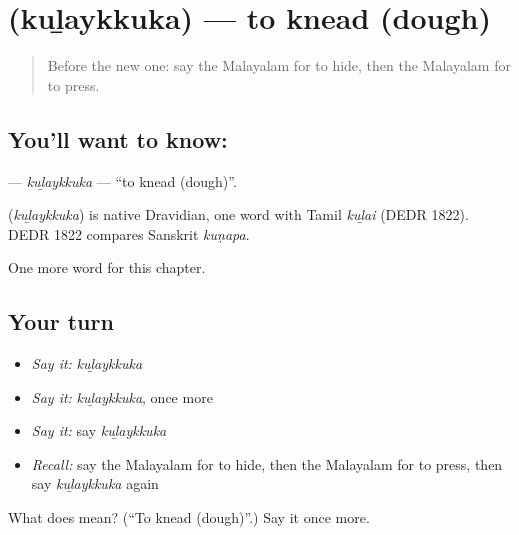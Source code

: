 \section[\texorpdfstring{\ml{കുഴയ്ക്കുക} (kuḻaykkuka)}{കുഴയ്ക്കുക (kuḻaykkuka)}]{ (kuḻaykkuka) — to knead (dough)}

\label{lesson:ML-C190-kulaykkuka}



\begin{quote}
Before the new one: say the Malayalam for to hide, then the Malayalam for to press.
\end{quote}

\subsection*{You'll want to know: }
\textbf{} — \emph{kuḻaykkuka} — \textquotedblleft{}to knead (dough)\textquotedblright{}.

\begin{cousinweb}
\textbf{} (\emph{kuḻaykkuka}) is native Dravidian, one word with Tamil \emph{kuḻai} (DEDR 1822). DEDR 1822 compares Sanskrit \emph{kuṇapa}.
\end{cousinweb}

\begin{grammarlens}[title={What you've built}]
One more word for this chapter.
\end{grammarlens}

\subsection*{Your turn}
\begin{itemize}
\raggedright
  \item \emph{Say it:} \emph{kuḻaykkuka}
  \item \emph{Say it:} \emph{kuḻaykkuka}, once more
  \item \emph{Say it:} say \emph{kuḻaykkuka}
  \item \emph{Recall:} say the Malayalam for to hide, then the Malayalam for to press, then say \emph{kuḻaykkuka} again
\end{itemize}

\begin{tcolorbox}[breakable,colback=teal!4,colframe=teal!35!black,title={Before you move on}]
What does  mean? (\textquotedblleft{}To knead (dough)\textquotedblright{}.) Say it once more.
\end{tcolorbox}
